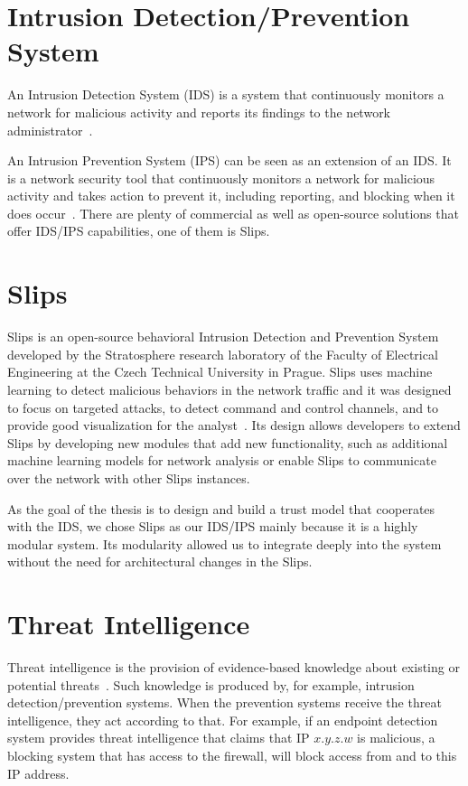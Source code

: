 \section{Intrusion Detection/Prevention System}
\label{sec:intrusion-detection-prevention-system}
An Intrusion Detection System (IDS) is a system that continuously monitors a network for malicious activity and reports its findings to the network administrator~\cite{bace2001intrusion}.

An Intrusion Prevention System (IPS) can be seen as an extension of an IDS. 
It is a network security tool that continuously monitors a network for malicious activity and takes action to prevent it, including reporting, and blocking when it does occur~\cite{zhang2004intrusion}.
There are plenty of commercial as well as open-source solutions that offer IDS/IPS capabilities, one of them is Slips.


\section{Slips}
\label{sec:slips}
Slips is an open-source behavioral Intrusion Detection and Prevention System developed by the Stratosphere research laboratory of the Faculty of Electrical Engineering at the Czech Technical University in Prague.
Slips uses machine learning to detect malicious behaviors in the network traffic and it was designed to focus on targeted attacks, to detect command and control channels, and to provide good visualization for the analyst~\cite{slips}.
Its design allows developers to extend Slips by developing new modules that add new functionality, such as additional machine learning models for network analysis or enable Slips to communicate over the network with other Slips instances.

As the goal of the thesis is to design and build a trust model that cooperates with the IDS, we chose Slips as our IDS/IPS mainly because it is a highly modular system.
Its modularity allowed us to integrate deeply into the system without the need for architectural changes in the Slips.

\section{Threat Intelligence}
\label{sec:threat-intelligence}
Threat intelligence is the provision of evidence-based knowledge about existing or potential threats~\cite{threatintelligence}.
Such knowledge is produced by, for example, intrusion 
detection/prevention systems.
When the prevention systems receive the threat intelligence, they act according to that.
For example, if an endpoint detection system provides threat intelligence that claims that IP $x.y.z.w$ is malicious, a blocking system that has access to the firewall, will block access from and to this IP address.

